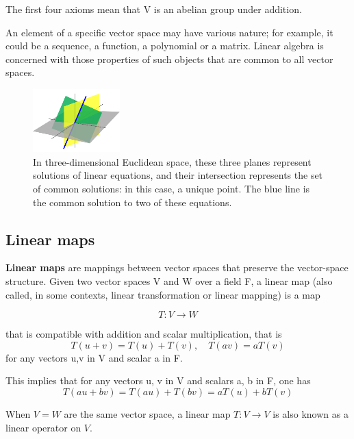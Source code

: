 \documentclass[a4paper,12pt]{article}
\begin{document}
    The first four axioms mean that V is an abelian group under addition.

    An element of a specific vector space may have various nature; for example, it could be a sequence, a function,
    a polynomial or a matrix. Linear algebra is concerned with those properties of such objects that are common to
    all vector spaces.


    \begin{figure}[h]
        \begin{center}


            \includegraphics[width=0.3\textwidth]{pic1.png}
            \caption{
                \scriptsize {
                    In three-dimensional Euclidean space, these three planes represent solutions of linear equations,
                    and their intersection represents the set of common solutions: in this case, a unique point. The blue line is
                    the common solution to two of these equations.
                }
            }
        \end{center}

    \end{figure}

    \subsection{Linear maps}
    \label{maps}
    \textbf{Linear maps} are mappings between vector spaces that preserve the vector-space structure. Given two vector
    spaces V and W over a field F, a linear map (also called, in some contexts, linear transformation or linear mapping)
    is a map

    $$T:V\to W$$

    that is compatible with addition and scalar multiplication, that is
    $$T(u+v)=T(u)+T(v),\quad T(av)=aT(v)$$
    for any vectors u,v in V and scalar a in F.

    This implies that for any vectors u, v in V and scalars a, b in F, one has
    $$T(au+bv)=T(au)+T(bv)=aT(u)+bT(v)$$

    When $V = W$ are the same vector space, a linear map $T:V\to V$ is also known as a linear operator on $V$.
\end{document}
